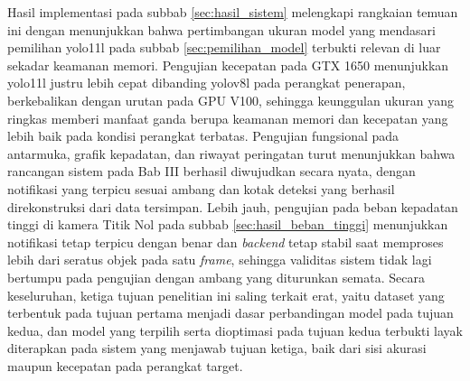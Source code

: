 Hasil implementasi pada subbab \ref{sec:hasil_sistem} melengkapi rangkaian temuan ini 
dengan menunjukkan bahwa pertimbangan ukuran model yang mendasari pemilihan yolo11l pada 
subbab \ref{sec:pemilihan_model} terbukti relevan di luar sekadar keamanan memori. 
Pengujian kecepatan pada GTX 1650 menunjukkan yolo11l justru lebih cepat dibanding yolov8l 
pada perangkat penerapan, berkebalikan dengan urutan pada GPU V100, sehingga keunggulan 
ukuran yang ringkas memberi manfaat ganda berupa keamanan memori dan kecepatan yang lebih 
baik pada kondisi perangkat terbatas. Pengujian fungsional pada antarmuka, grafik kepadatan, 
dan riwayat peringatan turut menunjukkan bahwa rancangan sistem pada Bab III berhasil 
diwujudkan secara nyata, dengan notifikasi yang terpicu sesuai ambang dan kotak deteksi yang 
berhasil direkonstruksi dari data tersimpan. Lebih jauh, pengujian pada beban kepadatan 
tinggi di kamera Titik Nol pada subbab \ref{sec:hasil_beban_tinggi} menunjukkan notifikasi 
tetap terpicu dengan benar dan \textit{backend} tetap stabil saat memproses lebih dari 
seratus objek pada satu \textit{frame}, sehingga validitas sistem tidak lagi bertumpu pada 
pengujian dengan ambang yang diturunkan semata. Secara keseluruhan, ketiga tujuan penelitian 
ini saling terkait erat, yaitu dataset yang terbentuk pada tujuan pertama menjadi dasar 
perbandingan model pada tujuan kedua, dan model yang terpilih serta dioptimasi pada tujuan 
kedua terbukti layak diterapkan pada sistem yang menjawab tujuan ketiga, baik dari sisi 
akurasi maupun kecepatan pada perangkat target.
